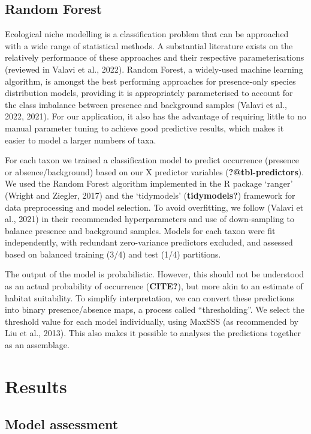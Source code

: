 \documentclass[
  number,
  review]{elsarticle}
\begin{document}
\subsection{Random Forest}\label{random-forest}

Ecological niche modelling is a classification problem that can be
approached with a wide range of statistical methods. A substantial
literature exists on the relatively performance of these approaches and
their respective parameterisations (reviewed in Valavi et al., 2022).
Random Forest, a widely-used machine learning algorithm, is amongst the
best performing approaches for presence-only species distribution
models, providing it is appropriately parameterised to account for the
class imbalance between presence and background samples (Valavi et al.,
2022, 2021). For our application, it also has the advantage of requiring
little to no manual parameter tuning to achieve good predictive results,
which makes it easier to model a larger numbers of taxa.

For each taxon we trained a classification model to predict occurrence
(presence or absence/background) based on our X predictor variables
(\textbf{?@tbl-predictors}). We used the Random Forest algorithm
implemented in the R package `ranger' (Wright and Ziegler, 2017) and the
`tidymodels' (\textbf{tidymodels?}) framework for data preprocessing and
model selection. To avoid overfitting, we follow (Valavi et al., 2021)
in their recommended hyperparameters and use of down-sampling to balance
presence and background samples. Models for each taxon were fit
independently, with redundant zero-variance predictors excluded, and
assessed based on balanced training (3/4) and test (1/4) partitions.

The output of the model is probabilistic. However, this should not be
understood as an actual probability of occurrence (\textbf{CITE?}), but
more akin to an estimate of habitat suitability. To simplify
interpretation, we can convert these predictions into binary
presence/absence maps, a process called ``thresholding''. We select the
threshold value for each model individually, using MaxSSS (as
recommended by Liu et al., 2013). This also makes it possible to
analyses the predictions together as an assemblage.

\section{Results}\label{results}

\subsection{Model assessment}\label{model-assessment}
\end{document}
